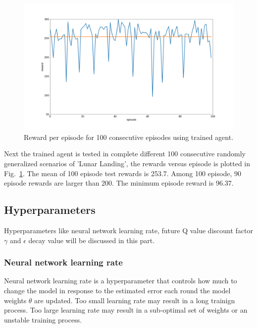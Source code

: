 \documentclass[conference]{IEEEtran}
\begin{document}
\begin{figure}[ht]
\includegraphics[width=\linewidth]{testing_episode_reward.png}
\caption{Reward per episode for 100 consecutive episodes using trained agent.}
\label{fig10}
\end{figure}

Next the trained agent is tested in complete different 100 consecutive randomly generalized scenarios of 'Lunar Landing', the rewards versus episode is plotted in Fig.~\ref{fig10}. The mean of 100 episode test rewards is 253.7. Among 100 episode, 90 episode rewards are larger than 200. The minimum episode reward is 96.37.

\subsection{Hyperparameters}\label{sec:hyper}

Hyperparameters like neural network learning rate, future Q value discount factor $\gamma$ and $\epsilon$ decay value will be discussed in this part.

\subsubsection{Neural network learning rate}\label{sec:lr}
Neural network learning rate is a hyperparameter that controls how much to change the model in response to the estimated error each round the model weights $\theta$ are updated. Too small learning rate may result in a long trainign process. Too large learning rate may result in a sub-optimal set of weights or an unstable training process. 
\end{document}
